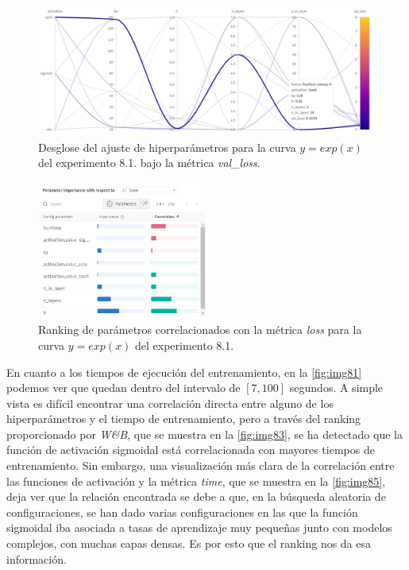 \begin{figure}[htbp]
    \centering
    \includegraphics[width=1\textwidth]{img/img79.png}
    \caption{Desglose del ajuste de hiperparámetros para la curva $y=exp(x)$ del experimento 8.1.  bajo la métrica \textit{val\_loss}.} 
    \label{fig:img79}
\end{figure}

\begin{figure}[htbp]
    \centering
    \includegraphics[width=0.5\textwidth]{img/img84.png}
    \caption{Ranking de parámetros correlacionados con la métrica \textit{loss} para la curva $y=exp(x)$ del experimento 8.1.}
    \label{fig:img84}
\end{figure}

En cuanto a los tiempos de ejecución del entrenamiento, en la \autoref{fig:img81} podemos ver que quedan dentro del intervalo de $[7,100]$ segundos. A simple vista es difícil encontrar una correlación directa entre alguno de los hiperparámetros y el tiempo de entrenamiento, pero a través del ranking proporcionado por \textit{W\&B}, que se muestra en la \autoref{fig:img83}, se ha detectado que la función de activación sigmoidal está correlacionada con mayores tiempos de entrenamiento. Sin embargo, una visualización más clara de la correlación entre las funciones de activación y la métrica \textit{time}, que se muestra en la \autoref{fig:img85}, deja ver que la relación encontrada se debe a que, en la búsqueda aleatoria de configuraciones, se han dado varias configuraciones en las que la función sigmoidal iba asociada a tasas de aprendizaje muy pequeñas junto con modelos complejos, con muchas capas densas. Es por esto que el ranking nos da esa 
información. 

